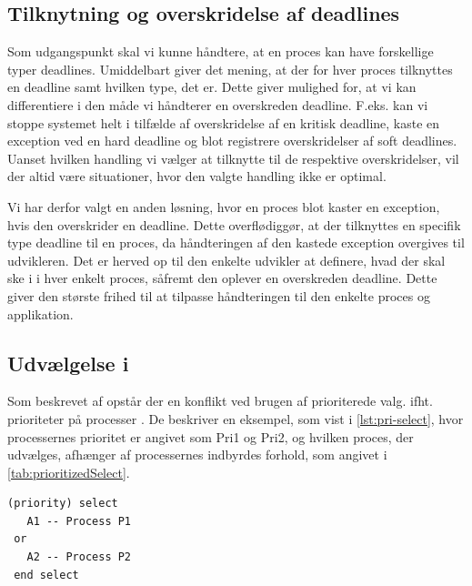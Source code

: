 \subsection{Tilknytning og overskridelse af deadlines}
Som udgangspunkt skal vi kunne håndtere, at en proces kan have forskellige typer deadlines. Umiddelbart giver det mening, at der for hver proces tilknyttes en deadline samt hvilken type, det er. Dette giver mulighed for, at vi kan differentiere i den måde vi håndterer en overskreden deadline. F.eks. kan vi stoppe systemet helt i tilfælde af overskridelse af en kritisk deadline, kaste en exception ved en hard deadline og blot registrere overskridelser af soft deadlines. Uanset hvilken handling vi vælger at tilknytte til de respektive overskridelser, vil der altid være situationer, hvor den valgte handling ikke er optimal. 

Vi har derfor valgt en anden løsning, hvor en proces blot kaster en exception, hvis den overskrider en deadline. Dette overflødiggør, at der tilknyttes en specifik type deadline til en proces, da håndteringen af den kastede exception overgives til udvikleren. Det er herved op til den enkelte udvikler at definere, hvad der skal ske i i hver enkelt proces, såfremt den oplever en overskreden deadline. Dette giver den største frihed til at tilpasse håndteringen til den enkelte proces og applikation. 

\subsection{Udvælgelse i }
Som  beskrevet af \citeauthor{Burns1990} opstår der en konflikt ved brugen af  prioriterede valg. ifht. prioriteter på processer \cite{Burns1990}. De beskriver en eksempel, som vist i \cref{lst:pri-select}, hvor processernes prioritet er angivet som Pri1 og Pri2, og hvilken proces, der udvælges, afhænger af processernes indbyrdes forhold, som angivet i \cref{tab:prioritizedSelect}.


\begin{lstlisting}[firstnumber=1 ,float=hbtp, label=lst:pri-select, caption={(priority) select. Eksemplet er kopieret fra \cite{Burns1990}}]
(priority) select
   A1 -- Process P1
 or
   A2 -- Process P2
 end select
\end{lstlisting}

